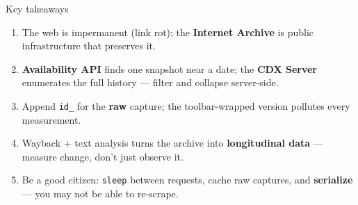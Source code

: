 \documentclass[9pt,aspectratio=169]{beamer}
\begin{document}
\begin{frame}{Key takeaways}
    \begin{enumerate}
        \item The web is impermanent (link rot); the \textbf{Internet Archive} is public infrastructure that preserves it.
        \item \textbf{Availability API} finds one snapshot near a date; the \textbf{CDX Server} enumerates the full history --- filter and collapse server-side.
        \item Append \texttt{id\_} for the \textbf{raw} capture; the toolbar-wrapped version pollutes every measurement.
        \item Wayback $+$ text analysis turns the archive into \textbf{longitudinal data} --- measure change, don't just observe it.
        \item Be a good citizen: \texttt{sleep} between requests, cache raw captures, and \textbf{serialize} --- you may not be able to re-scrape.
    \end{enumerate}
    \vspace{1em}
\end{frame}
\end{document}
